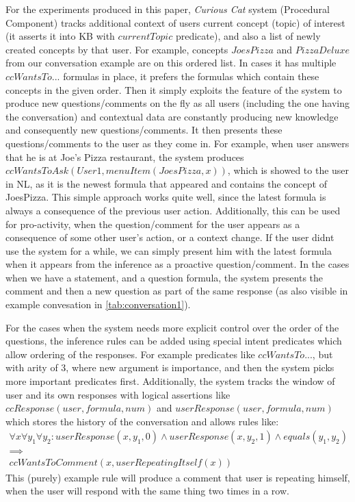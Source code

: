 For the experiments produced in this paper, \emph{Curious Cat} system 
(Procedural Component) tracks additional context of users current concept 
(topic) of interest (it asserts it into KB with $currentTopic$ predicate), and 
also a list of newly created concepts by that user. For example, concepts 
$JoesPizza$ and $PizzaDeluxe$ from our conversation example are on this ordered
list. In cases it has multiple $ccWantsTo...$ formulas in place, it prefers 
the formulas which contain these concepts in the given order. Then it simply 
exploits the feature of the system to produce new questions/comments on the fly
as all users (including the one having the conversation) and contextual data 
are constantly producing new knowledge and consequently new questions/comments.
It then presents these questions/comments to the user as they come in. For 
example, when user answers that he is at Joe's Pizza restaurant, the system 
produces $ccWantsToAsk(User1, menuItem(JoesPizza,x))$, which is showed to the 
user in NL, as it is the newest formula that appeared and contains the concept 
of JoesPizza. This simple approach works quite well, since the latest formula 
is always a consequence of the previous user action. Additionally, this can be 
used for pro-activity, when the question/comment for the user appears as a 
consequence of some other user's action, or a context change. If the user didnt
use the system for a while, we can simply present him with the latest formula 
when it appears from the inference as a proactive question/comment. In the cases
when we have a statement, and a question formula, the system presents the 
comment and then a new question as part of the same response (as also visible
in example convesation in \autoref{tab:conversation1}).

For the cases when the system needs more explicit control over the order of 
the questions, the inference rules can be added using special intent predicates
which allow ordering of the responses. For example predicates like 
$ccWantsTo...$, but with arity of 3, where new argument is importance, and then
the system picks more important predicates first. Additionally, the system 
tracks the window of user and its own responses with logical assertions like 
$ccResponse(user,formula,num)$ and $userResponse(user,formula,num)$ which 
stores the history of the conversation and allows rules like:
\begin{equation*}
\begin{gathered}
	\forall x \forall y_1 \forall y_2: userResponse(x,y_1,0) \land userResponse(x,y_2,1) \land equals(y_1,y_2) \\
	\implies \\
	ccWantsToComment(x,userRepeatingItself(x))
\end{gathered}
\end{equation*}
This (purely) example rule will produce a comment that user is repeating 
himself, when the user will respond with the same thing two times in a row.

